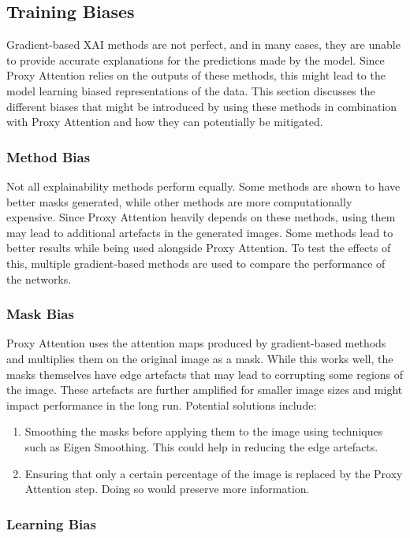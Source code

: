 \subsection{Training Biases}
Gradient-based XAI methods are not perfect, and in many cases, they are unable to provide accurate explanations for the predictions made by the model. Since Proxy Attention relies on the outputs of these methods, this might lead to the model learning biased representations of the data. This section discusses the different biases that might be introduced by using these methods in combination with Proxy Attention and how they can potentially be mitigated.

\subsubsection{Method Bias}
Not all explainability methods perform equally. Some methods are shown to have better masks generated, while other methods are more computationally expensive. Since Proxy Attention heavily depends on these methods, using them may lead to additional artefacts in the generated images. Some methods lead to better results while being used alongside Proxy Attention. To test the effects of this, multiple gradient-based methods are used to compare the performance of the networks.

\subsubsection{Mask Bias}
Proxy Attention uses the attention maps produced by gradient-based methods and multiplies them on the original image as a mask. While this works well, the masks themselves have edge artefacts that may lead to corrupting some regions of the image. These artefacts are further amplified for smaller image sizes and might impact performance in the long run.
Potential solutions include:

\begin{enumerate}
    \item Smoothing the masks before applying them to the image using techniques such as Eigen Smoothing. This could help in reducing the edge artefacts.
    \item Ensuring that only a certain percentage of the image is replaced by the Proxy Attention step. Doing so would preserve more information.
\end{enumerate}

\subsubsection{Learning Bias}

